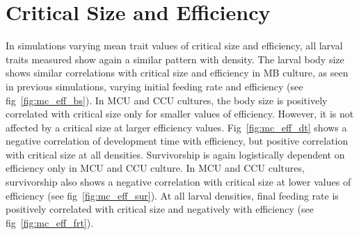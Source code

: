 \section{Critical Size and Efficiency}
In simulations varying mean trait values of critical size and efficiency, all larval traits measured show again a similar pattern with density. The larval body size shows similar correlations with critical size and efficiency in MB culture, as seen in previous simulations, varying initial feeding rate and efficiency (see fig~\ref{fig:mc_eff_bs}). In MCU and CCU cultures, the body size is positively correlated with critical size only for smaller values of efficiency. However, it is not affected by a critical size at larger efficiency values. Fig~\ref{fig:mc_eff_dt} shows a negative correlation of development time with efficiency, but positive correlation with critical size at all densities. Survivorship is again logistically dependent on efficiency only in MCU and CCU culture. In MCU and CCU cultures, survivorship also shows a negative correlation with critical size at lower values of efficiency (see fig~\ref{fig:mc_eff_sur}). At all larval densities, final feeding rate is positively correlated with critical size and negatively with efficiency (see fig~\ref{fig:mc_eff_frt}).
